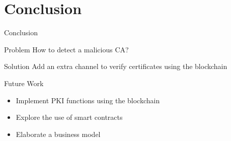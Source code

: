 \section[Conclusion]{Conclusion}
\begin{frame}{Conclusion}

\begin{alertblock}{Problem}
	How to detect a malicious CA?
\end{alertblock}

\begin{exampleblock}{Solution}
	Add an extra channel to verify certificates using the blockchain
\end{exampleblock}

\end{frame}



\begin{frame}{Future Work}

\begin{exampleblock}{}
\begin{itemize}

\item Implement PKI functions using the blockchain

\item Explore the use of smart contracts

\item Elaborate a business model

\end{itemize}
\end{exampleblock}

\end{frame}
